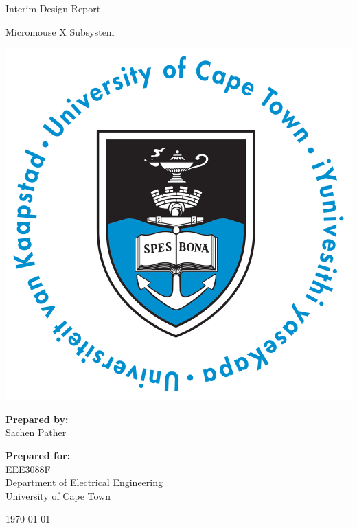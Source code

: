 \thispagestyle{empty}
\begin{center}
    
\Huge

\vspace{5cm}

Interim Design Report

\vspace{0.1cm}
\large
Micromouse X Subsystem

\vspace{2cm}
\includegraphics[width=0.6\linewidth]{FrontMatter/UCT_logo.png}

\vfill

\large
\textbf{Prepared by:}\\
Sachen Pather

\vspace{1cm}

\textbf{Prepared for:}\\
EEE3088F\\
Department of Electrical Engineering\\
University of Cape Town

\vspace{2cm}

\today


\end{center}